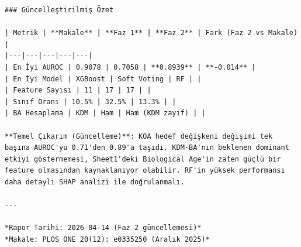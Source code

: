 ﻿\documentclass[11pt,a4paper]{article}
\begin{document}
\begin{verbatim}
### Güncelleştirilmiş Özet

| Metrik | **Makale** | **Faz 1** | **Faz 2** | Fark (Faz 2 vs Makale) |
|---|---|---|---|---|
| En İyi AUROC | 0.9078 | 0.7058 | **0.8939** | **-0.014** |
| En İyi Model | XGBoost | Soft Voting | RF | |
| Feature Sayısı | 11 | 17 | 17 | |
| Sınıf Oranı | 10.5% | 32.5% | 13.3% | |
| BA Hesaplama | KDM | Ham | Ham (KDM zayıf) | |

**Temel Çıkarım (Güncelleme)**: KOA hedef değişkeni değişimi tek başına AUROC'yu 0.71'den 0.89'a taşıdı. KDM-BA'nın beklenen dominant etkiyi göstermemesi, Sheet1'deki Biological Age'in zaten güçlü bir feature olmasından kaynaklanıyor olabilir. RF'in yüksek performansı daha detaylı SHAP analizi ile doğrulanmalı.

---

*Rapor Tarihi: 2026-04-14 (Faz 2 güncellemesi)*
*Makale: PLOS ONE 20(12): e0335250 (Aralık 2025)*
\end{verbatim}
\end{document}
